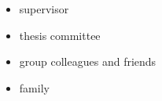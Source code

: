 \acknowledgments

\begin{itemize}
	\item supervisor
	\item thesis committee
	\item group colleagues and friends
	\item family
\end{itemize}

\endacknowledgments
